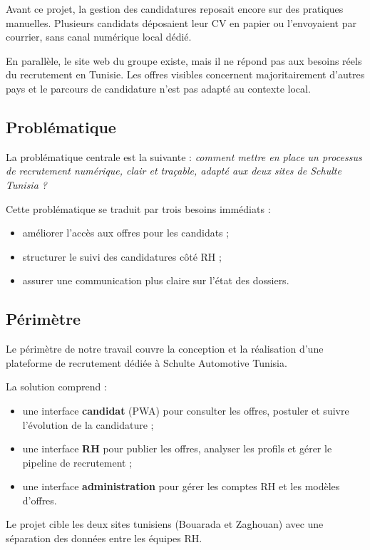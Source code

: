 Avant ce projet, la gestion des candidatures reposait encore sur des
pratiques manuelles. Plusieurs candidats déposaient leur CV en papier
ou l'envoyaient par courrier, sans canal numérique local dédié.

En parallèle, le site web du groupe existe, mais il ne répond pas aux
besoins réels du recrutement en Tunisie. Les offres visibles concernent
majoritairement d'autres pays et le parcours de candidature n'est pas
adapté au contexte local.

\subsection{Problématique}

La problématique centrale est la suivante :
\textit{comment mettre en place un processus de recrutement numérique,
clair et traçable, adapté aux deux sites de Schulte Tunisia ?}

Cette problématique se traduit par trois besoins immédiats :
\begin{itemize}
    \item améliorer l'accès aux offres pour les candidats ;
    \item structurer le suivi des candidatures côté RH ;
    \item assurer une communication plus claire sur l'état des dossiers.
\end{itemize}

\subsection{Périmètre}

Le périmètre de notre travail couvre la conception et la réalisation
d'une plateforme de recrutement dédiée à Schulte Automotive Tunisia.

La solution comprend :
\begin{itemize}
    \item une interface \textbf{candidat} (PWA) pour consulter les offres,
    postuler et suivre l'évolution de la candidature ;
    \item une interface \textbf{RH} pour publier les offres, analyser les
    profils et gérer le pipeline de recrutement ;
    \item une interface \textbf{administration} pour gérer les comptes RH
    et les modèles d'offres.
\end{itemize}

Le projet cible les deux sites tunisiens (Bouarada et Zaghouan) avec une
séparation des données entre les équipes RH.


